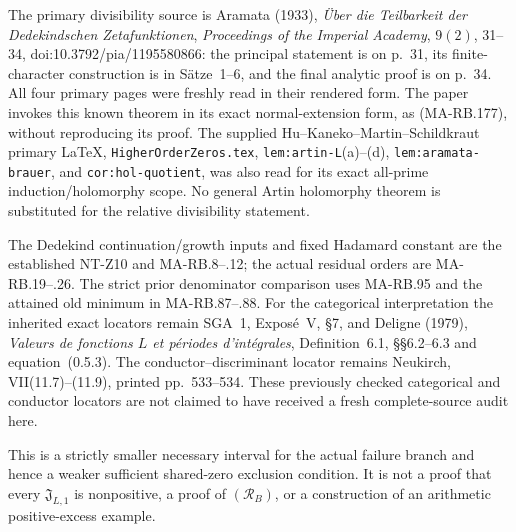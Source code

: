 The primary divisibility source is Aramata
(1933), \emph{Über die Teilbarkeit der Dedekindschen
Zetafunktionen}, \emph{Proceedings of the Imperial
Academy}, \(9(2)\), 31--34,
doi:10.3792/pia/1195580866:
the principal statement is on p.~31, its
finite-character construction is in Sätze~1--6,
and the final analytic proof is on p.~34.
All four primary pages were freshly read in
their rendered form. The paper invokes this
known theorem in its exact normal-extension form,
as (MA-RB.177), without reproducing its proof.
The supplied Hu--Kaneko--Martin--Schildkraut
primary LaTeX, \texttt{HigherOrderZeros.tex},
\texttt{lem:artin-L}(a)--(d),
\texttt{lem:aramata-brauer}, and
\texttt{cor:hol-quotient}, was also read for
its exact all-prime induction/holomorphy scope.
No general Artin holomorphy theorem is substituted
for the relative divisibility statement.

The Dedekind continuation/growth inputs and
fixed Hadamard constant are the established
NT-Z10 and MA-RB.8--.12; the actual residual
orders are MA-RB.19--.26. The strict prior
denominator comparison uses MA-RB.95 and the
attained old minimum in MA-RB.87--.88.
For the categorical interpretation the inherited
exact locators remain SGA~1, Exposé~V, \S7,
and Deligne (1979), \emph{Valeurs de fonctions
\(L\) et périodes d'intégrales},
Definition~6.1, \S\S6.2--6.3 and equation~(0.5.3).
The conductor--discriminant locator remains
Neukirch, VII(11.7)--(11.9), printed pp.~533--534.
These previously checked categorical and
conductor locators are not claimed to have
received a fresh complete-source audit here.

This is a strictly smaller necessary interval
for the actual failure branch and hence a
weaker sufficient shared-zero exclusion
condition. It is not a proof that every
\(\mathfrak J_{L,1}\) is nonpositive, a proof
of \((\mathcal R_B)\), or a construction of
an arithmetic positive-excess example.
